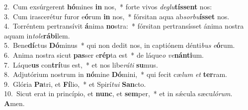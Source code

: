 {2.~}Cum exsúrgerent \textbf{hó}mines \textbf{in} nos,~* forte vivos \textit{de}\textit{glu}\textbf{tís}\textbf{sent} nos:\\
{3.~}Cum irascerétur furor e\textbf{ó}rum \textbf{in} nos,~* fórsitan aqua ab\textit{sor}\textit{bu}\textbf{ís}\textbf{set} nos.\\
{4.~}Torréntem pertransívit \textbf{á}nima \textbf{no}stra:~* fórsitan pertransísset ánima nostra aquam in\textit{to}\textit{le}\textbf{rá}\textbf{bi}lem.\\
{5.~}Bene\textbf{dí}ctus \textbf{Dó}minus~* qui non dedit nos, in captiónem dénti\textit{bus} \textit{e}\textbf{ó}rum.\\
{6.~}Anima nostra sicut \textbf{pas}ser e\textbf{rép}ta est~* de láque\textit{o} \textit{ve}\textbf{nán}\textbf{ti}um.\\
{7.~}Láque\textbf{us} con\textbf{trí}tus est,~* et nos libe\textit{rá}\textit{ti} \textbf{su}mus.\\
{8.~}Adjutórium nostrum in \textbf{nó}mine \textbf{Dó}mini,~* qui fecit cæ\textit{lum} \textit{et} \textbf{ter}ram.\\
{9.~}Glória \textbf{Pa}tri, et \textbf{Fí}lio,~* et Spirí\textit{tu}\textit{i} \textbf{San}cto.\\
{10.~}Sicut erat in princípio, et \textbf{nunc}, et \textbf{sem}per,~* et in sǽcula sæcu\textit{ló}\textit{rum}. \textbf{A}men.\\
